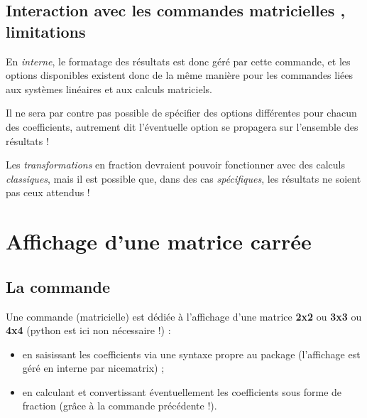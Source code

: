 \documentclass[french,a4paper,11pt]{article}
\begin{document}
\subsection{Interaction avec les commandes \og matricielles \fg, limitations}

\begin{warningblock}
En \textit{interne}, le formatage des résultats est donc géré par cette commande, et les options disponibles existent donc de la même manière pour les commandes liées aux systèmes linéaires et aux calculs matriciels.

\smallskip

Il ne sera par contre pas possible de spécifier des options différentes pour chacun des coefficients, autrement dit l'éventuelle option se propagera sur l'ensemble des résultats !

\smallskip

Les \textit{transformations} en fraction devraient pouvoir fonctionner avec des calculs \textit{classiques}, mais il est possible que, dans des cas \textit{spécifiques}, les résultats ne soient pas ceux attendus !
\end{warningblock}

\pagebreak

\section{Affichage d'une matrice carrée}

\subsection{La commande}

\begin{cautionblock}
Une commande (matricielle) est dédiée à l'affichage d'une matrice \textbf{2x2} ou \textbf{3x3} ou \textbf{4x4} (\textsf{python} est ici non nécessaire !) :

\begin{itemize}
	\item en saisissant les coefficients via une syntaxe propre au package (l'affichage est géré en interne par \textsf{nicematrix}) ;
	\item en calculant et convertissant éventuellement les coefficients sous forme de fraction (grâce à la commande précédente !).
\end{itemize}
\vspace*{-\baselineskip}\leavevmode
\end{cautionblock}
\end{document}
